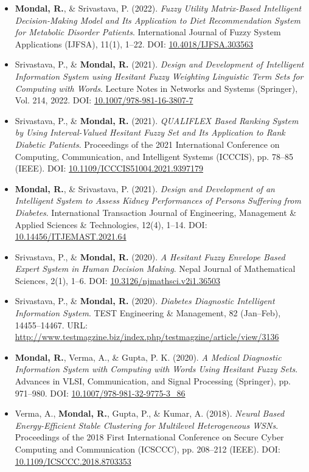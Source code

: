\documentclass[a4paper,11pt]{article}
\newcommand{\resumeItem}[1]{
  \item\small{
    {#1 \vspace{3pt}} %
  }
}
\newcommand{\resumeSubHeadingListStart}{\begin{itemize}[leftmargin=0.15in, label={}]}
\newcommand{\resumeSubHeadingListEnd}{\end{itemize}}
\begin{document}
\resumeSubHeadingListStart

\resumeItem{
\textbf{Mondal, R.}, \& Srivastava, P. (2022).
\textit{Fuzzy Utility Matrix-Based Intelligent Decision-Making Model and Its Application to Diet Recommendation System for Metabolic Disorder Patients}.
International Journal of Fuzzy System Applications (IJFSA), 11(1), 1--22.
DOI: \href{https://doi.org/10.4018/IJFSA.303563}{10.4018/IJFSA.303563}
}

\resumeItem{
Srivastava, P., \& \textbf{Mondal, R.} (2021).
\textit{Design and Development of Intelligent Information System using Hesitant Fuzzy Weighting Linguistic Term Sets for Computing with Words}.
Lecture Notes in Networks and Systems (Springer), Vol. 214, 2022.
DOI: \href{https://doi.org/10.1007/978-981-16-3807-7}{10.1007/978-981-16-3807-7}
}

\resumeItem{
Srivastava, P., \& \textbf{Mondal, R.} (2021).
\textit{QUALIFLEX Based Ranking System by Using Interval-Valued Hesitant Fuzzy Set and Its Application to Rank Diabetic Patients}.
Proceedings of the 2021 International Conference on Computing, Communication, and Intelligent Systems (ICCCIS), pp. 78--85 (IEEE).
DOI: \href{https://doi.org/10.1109/ICCCIS51004.2021.9397179}{10.1109/ICCCIS51004.2021.9397179}
}

\resumeItem{
\textbf{Mondal, R.}, \& Srivastava, P. (2021).
\textit{Design and Development of an Intelligent System to Assess Kidney Performances of Persons Suffering from Diabetes}.
International Transaction Journal of Engineering, Management \& Applied Sciences \& Technologies, 12(4), 1--14.
DOI: \href{https://doi.org/10.14456/ITJEMAST.2021.64}{10.14456/ITJEMAST.2021.64}
}

\resumeItem{
Srivastava, P., \& \textbf{Mondal, R.} (2020).
\textit{A Hesitant Fuzzy Envelope Based Expert System in Human Decision Making}.
Nepal Journal of Mathematical Sciences, 2(1), 1--6.
DOI: \href{https://doi.org/10.3126/njmathsci.v2i1.36503}{10.3126/njmathsci.v2i1.36503}
}

\resumeItem{
Srivastava, P., \& \textbf{Mondal, R.} (2020).
\textit{Diabetes Diagnostic Intelligent Information System}.
TEST Engineering \& Management, 82 (Jan--Feb), 14455--14467.
URL: \href{http://www.testmagzine.biz/index.php/testmagzine/article/view/3136}
{http://www.testmagzine.biz/index.php/testmagzine/article/view/3136}
}

\resumeItem{
\textbf{Mondal, R.}, Verma, A., \& Gupta, P. K. (2020).
\textit{A Medical Diagnostic Information System with Computing with Words Using Hesitant Fuzzy Sets}.
Advances in VLSI, Communication, and Signal Processing (Springer), pp. 971--980.
DOI: \href{https://doi.org/10.1007/978-981-32-9775-3_86}{10.1007/978-981-32-9775-3\_86}
}

\resumeItem{
Verma, A., \textbf{Mondal, R.}, Gupta, P., \& Kumar, A. (2018).
\textit{Neural Based Energy-Efficient Stable Clustering for Multilevel Heterogeneous WSNs}.
Proceedings of the 2018 First International Conference on Secure Cyber Computing and Communication (ICSCCC), pp. 208--212 (IEEE).
DOI: \href{https://doi.org/10.1109/ICSCCC.2018.8703353}{10.1109/ICSCCC.2018.8703353}
}

\resumeSubHeadingListEnd
\end{document}
